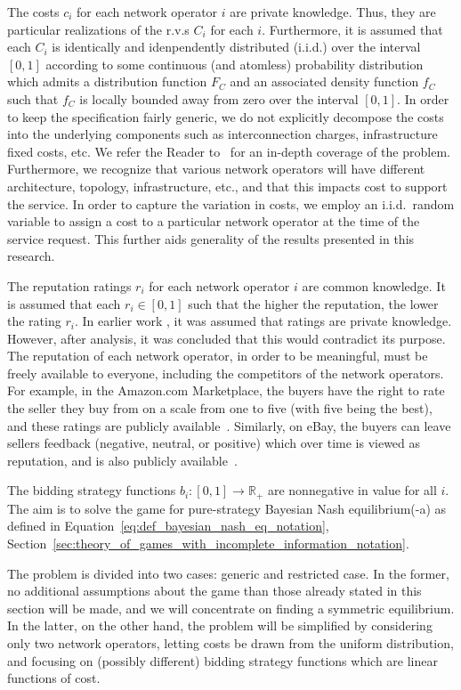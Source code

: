 The costs $c_i$ for each network operator $i$ are private knowledge. Thus, they are particular realizations of the r.v.s $C_i$ for each $i$. Furthermore, it is assumed that each $C_i$ is identically and idenpendently distributed (i.i.d.) over the interval $[0,1]$ according to some continuous (and atomless) probability distribution which admits a distribution function $F_{C}$ and an associated density function $f_{C}$ such that $f_C$ is locally bounded away from zero over the interval $[0,1]$. In order to keep the specification fairly generic, we do not explicitly decompose the costs into the underlying components such as interconnection charges, infrastructure fixed costs, etc. We refer the Reader to~\cite{Njoroge2009,LeCadre2009,HauBrenner2009} for an in-depth coverage of the problem. Furthermore, we recognize that various network operators will have different architecture, topology, infrastructure, etc., and that this impacts cost to support the service. In order to capture the variation in costs, we employ an i.i.d.~random variable to assign a cost to a particular network operator at the time of the service request. This further aids generality of the results presented in this research.

The reputation ratings $r_i$ for each network operator $i$ are common knowledge. It is assumed that each $r_i\in [0,1]$ such that the higher the reputation, the lower the rating $r_i$. In earlier work \cite{DMKonkaUbi11}, it was assumed that ratings are private knowledge. However, after analysis, it was concluded that this would contradict its purpose. The reputation of each network operator, in order to be meaningful, must be freely available to everyone, including the competitors of the network operators. For example, in the Amazon.com Marketplace, the buyers have the right to rate the seller they buy from on a scale from one to five (with five being the best), and these ratings are publicly available~\cite{AMAZON}. Similarly, on eBay, the buyers can leave sellers feedback (negative, neutral, or positive) which over time is viewed as reputation, and is also publicly available~\cite{EBAY}.
	
The bidding strategy functions $b_i: [0,1]\to\mathbb{R_+}$ are nonnegative in value for all $i$. The aim is to solve the game for pure-strategy Bayesian Nash equilibrium(-a) as defined in Equation~\eqref{eq:def_bayesian_nash_eq_notation}, Section~\ref{sec:theory_of_games_with_incomplete_information_notation}.

The problem is divided into two cases: generic and restricted case. In the former, no additional assumptions about the game than those already stated in this section will be made, and we will concentrate on finding a symmetric equilibrium. In the latter, on the other hand, the problem will be simplified by considering only two network operators, letting costs be drawn from the uniform distribution, and focusing on (possibly different) bidding strategy functions which are linear functions of cost.

